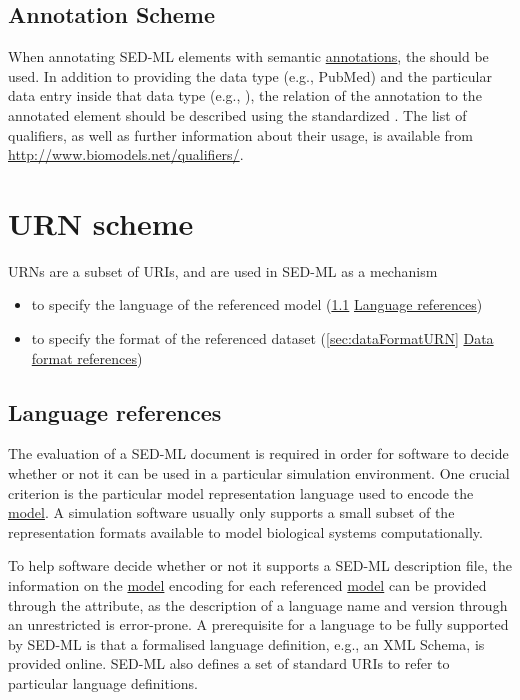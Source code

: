 \subsection{Annotation Scheme}
\label{sec:annotations}
When annotating SED-ML elements with semantic \hyperref[class:annotation]{annotations}, the  should be used. In addition to providing the data type (e.g., PubMed) and the particular data entry inside that data type (e.g., ), the relation of the annotation to the annotated element should be described using the standardized . The list of qualifiers, as well as further information about their usage, is available from \url{http://www.biomodels.net/qualifiers/}.


\section{URN scheme}  
\label{sec:urnScheme}
URNs are a subset of URIs, and are used in SED-ML as a mechanism
\begin{itemize}
	\item to specify the language of the referenced model (\ref{sec:languageURN} \hyperref[sec:languageURN]{Language references})
	\item to specify the format of the referenced dataset (\ref{sec:dataFormatURN} \hyperref[sec:dataFormatURN]{Data format references})
\end{itemize}

\subsection{Language references}
\label{sec:languageURN}
The evaluation of a SED-ML document is required in order for software to decide whether or not it can be used in a particular simulation environment. One crucial criterion is the particular model representation language used to encode the \hyperref[class:model]{model}. A simulation software usually only supports a small subset of the representation formats available to model biological systems computationally. 

To help  software decide whether or not it supports a SED-ML description file, the information on the \hyperref[class:model]{model} encoding for each referenced \hyperref[class:model]{model} can be provided through the \hyperref[sec:language]{} attribute, as the description of a language name and version through an unrestricted  is error-prone. 
A prerequisite for a language to be fully supported by SED-ML is that a formalised language definition, e.g., an XML Schema, is provided online. SED-ML also defines a set of standard URIs to refer to particular language definitions. 

